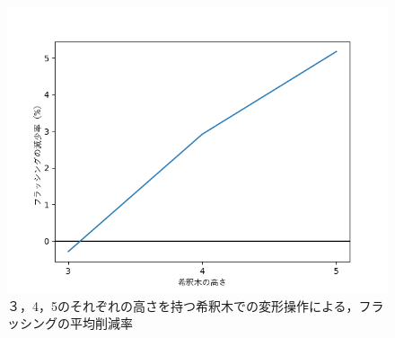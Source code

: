 \begin{figure}[tbp]
 \centering 
    \includegraphics[scale=1.0]{img/decreasement.png}
 \caption{３，4，5のそれぞれの高さを持つ希釈木での変形操作による，フラッシングの平均削減率}\label{fig:graph}
\end{figure}
